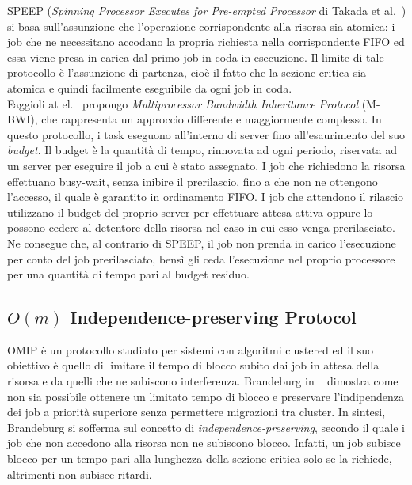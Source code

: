 SPEEP (\textit{Spinning Processor Executes for Pre-empted Processor} di Takada et al.~\cite{641276}) si basa sull'assunzione che l'operazione corrispondente alla risorsa sia atomica: i job che ne necessitano accodano la propria richiesta nella corrispondente FIFO ed essa viene presa in carica dal primo job in coda in esecuzione. Il limite di tale protocollo è l'assunzione di partenza, cioè il fatto che la sezione critica sia atomica e quindi facilmente eseguibile da ogni job in coda.\\

Faggioli at el.~\cite{5562902} propongo \textit{Multiprocessor Bandwidth Inheritance Protocol} (M-BWI), che rappresenta un approccio differente e maggiormente complesso. In questo protocollo, i task eseguono all'interno di server fino all'esaurimento del suo \textit{budget}. Il budget è la quantità di tempo, rinnovata ad ogni periodo, riservata ad un server per eseguire il job a cui è stato assegnato. I job che richiedono la risorsa effettuano busy-wait, senza inibire il prerilascio, fino a che non ne ottengono l'accesso, il quale è garantito in ordinamento FIFO. I job che attendono il rilascio utilizzano il budget del proprio server per effettuare attesa attiva oppure lo possono cedere al detentore della risorsa nel caso in cui esso venga prerilasciato. Ne consegue che, al contrario di SPEEP, il job non prenda in carico l'esecuzione per conto del job prerilasciato, bensì gli ceda l'esecuzione nel proprio processore per una quantità di tempo pari al budget residuo.\\

\subsection{$O(m)$ Independence-preserving Protocol}
\label{sec:lockProtocols.omip}

OMIP è un protocollo studiato per sistemi con algoritmi clustered ed il suo obiettivo è quello di limitare il tempo di blocco subito dai job in attesa della risorsa e da quelli che ne subiscono interferenza. Brandeburg in ~\cite{6602109} dimostra come non sia possibile ottenere un limitato tempo di blocco e preservare l’indipendenza dei job a priorità superiore senza permettere migrazioni tra cluster. In sintesi, Brandeburg si sofferma sul concetto di \textit{independence-preserving}, secondo il quale i job che non accedono alla risorsa non ne subiscono blocco. Infatti, un job subisce blocco per un tempo pari alla lunghezza della sezione critica solo se la richiede, altrimenti non subisce ritardi.\\

